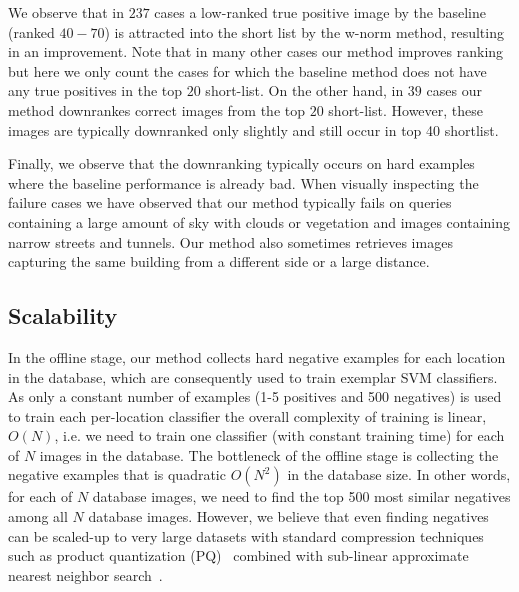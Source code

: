       We observe that in $237$ cases a low-ranked true positive image by the baseline (ranked $40-70$)  is attracted into the short list by the w-norm method, resulting in an improvement.  Note that in many other cases our method improves ranking but here we only count the cases for which the baseline method does not have any true positives in the top $20$ short-list. 
      \textcolor{petr}{On the other hand, in $39$ cases our method downrankes correct images from the top $20$ short-list. However, these images are typically downranked only slightly and still occur in top 40 shortlist.}

      Finally, we observe that \textcolor{petr} {the downranking} typically occurs on hard examples where the baseline performance is already bad. 
      \textcolor{petr}{
        When visually inspecting the failure cases we have observed that our method typically fails on queries containing a large amount of sky with clouds or vegetation and images containing narrow streets and tunnels. Our method also sometimes retrieves images capturing the same building from a different side or a large distance.
      }



  \subsection{{Scalability}}
  \label{sec:scalability}
    {
      In the offline stage, our method collects hard negative examples for each location in the database, which are consequently used to train exemplar SVM classifiers. 
      As only a constant number of examples (1-5 positives and 500 negatives) is used to train each per-location classifier the overall complexity of training is linear, $O(N)$, i.e. we need to train one classifier (with constant training time) for each of $N$ images in the database. The bottleneck of the offline stage is collecting the negative examples that is quadratic $O(N^2)$ in the database size. In other words, for each of $N$ database images, we need to find the top 500 most similar negatives among all $N$ database images.
      However, we believe that even finding negatives can be scaled-up to very large datasets with standard compression techniques such as product quantization (PQ)~\cite{Jegou11} combined with sub-linear approximate nearest neighbor search~\cite{Flann2014}.
    }

